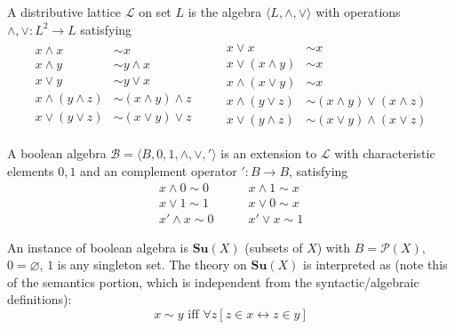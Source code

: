 \begin{exa}
  A distributive lattice $\mathcal{L}$ on set $L$ is the algebra $\langle L,
  \land, \vee \rangle$ with operations $\land, \vee : L^2 \to L$ satisfying
  \begin{gather*}
    \begin{aligned}
      x \land x & \sim x\\
      x \land y & \sim y \land x\\
      x \vee y  & \sim y \vee x\\
      x \land (y \land z) & \sim (x \land y) \land z\\
      x \vee (y \vee z) & \sim (x \vee y) \vee z
    \end{aligned}
    \qquad
    \begin{aligned}
      x \vee x & \sim x\\
      x \vee (x \land y) & \sim x\\
      x \land (x \vee y) & \sim x\\
      x \land (y \vee z) & \sim (x \land y) \vee (x \land z)\\
      x \vee (y \land z) & \sim (x \vee y) \land (x \vee z)
    \end{aligned}
  \end{gather*}

  A boolean algebra $\mathcal{B} = \langle B, 0, 1, \land, \vee, ' \rangle$ is an
  extension to $\mathcal{L}$ with characteristic elements $0,1$ and an complement
  operator $' : B \to B$, satisfying
  \begin{equation*}
    \begin{aligned}
      x \land 0 \sim 0\\
      x \vee 1 \sim 1\\
      x' \land x \sim 0
    \end{aligned}
    \qquad
    \begin{aligned}
      x \land 1 \sim x\\
      x \vee 0 \sim x\\
      x' \vee x \sim 1
    \end{aligned}
  \end{equation*}

  An instance of boolean algebra is $\textbf{Su}(X)$ (subsets of $X$) with $B =
  \mathcal{P}(X)$, $0 = \varnothing$, $1$ is any singleton set. The theory on
  $\textbf{Su}(X)$ is interpreted as (note this of the semantics portion, which
  is independent from the syntactic/algebraic definitions):
  \[
    x \sim y \text{ iff } \forall z \left[ z \in x \leftrightarrow z \in y \right]
  \]
\end{exa}

